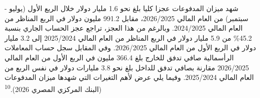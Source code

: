 شهد ميزان المدفوعات عجزا كليا بلغ نحو 1.6 مليار دولار خلال الربع الأول (يوليو - سبتمبر) من العام المالي 2026/2025، مقابل 991.2 مليون دولار في الربع المناظر من العام المالي 2024/2025. وبالرغم من هذا العجز، تراجع عجز الحساب الجاري بنسبة 45.2\% من 5.9 مليار دولار في الربع المناظر من العام المالي 2025/2024 إلى 3.2 مليار دولار في الربع الأول من العام المالي 2026/2025. وفي المقابل سجل حساب المعاملات الرأسمالية صافي تدفق للخارج بلغ 366.4 مليون في الربع الأول من العام المالي 2026/2025 مقارنة بصافي تدفق للداخل بلغ نحو 3.8 مليارات دولار في نفس الربع من العام المالي 2025/2024. وفيما يلي عرض لأهم التغيرات التي شهدها ميزان المدفوعات (البنك المركزي المصري 2026).\textsuperscript{10}
